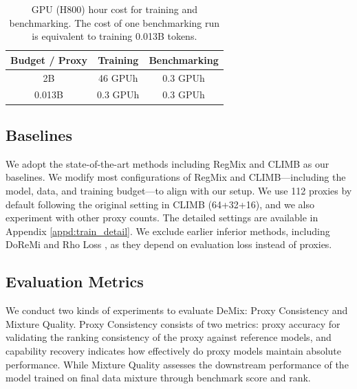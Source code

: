 \documentclass{article}
\theoremstyle{plain}
\theoremstyle{definition}
\theoremstyle{remark}
\newcommand{\comments}[1]{\textcolor{red}{#1}}
\begin{document}
\begin{table}[t]
  \caption{GPU (H800) hour cost for training and benchmarking. The cost of one benchmarking run is equivalent to training 0.013B tokens.}
  \label{table:cost}
  \begin{center}
        \begin{tabular}{ccc}
          \toprule
          Budget / Proxy & Training & Benchmarking\\
          \midrule
        2B & 46 GPUh & 0.3 GPUh \\
        0.013B & 0.3 GPUh & 0.3 GPUh \\
          \bottomrule
        \end{tabular}
  \end{center}
  \vskip -0.1in
\end{table}



\subsection{Baselines}
We adopt the state-of-the-art methods including RegMix \cite{liu2024regmix} and CLIMB \cite{diao2025climb} as our baselines. We modify most configurations of RegMix and CLIMB—including the model, data, and training budget—to align with our setup. We use 112 proxies by default following the original setting in CLIMB (64+32+16), and we also experiment with other proxy counts. The detailed settings are available in Appendix \ref{appd:train_detail}. We exclude earlier inferior methods, including DoReMi \cite{xie2023doremi} and Rho Loss \cite{mindermann2022prioritized}, as they depend on evaluation loss instead of proxies.%



\subsection{Evaluation Metrics}


We conduct two kinds of experiments to evaluate DeMix: Proxy Consistency and Mixture Quality. Proxy Consistency consists of two metrics: proxy accuracy for validating the ranking consistency of the proxy against reference models, and capability recovery indicates how effectively do proxy models maintain absolute performance. While Mixture Quality assesses the downstream performance of the model trained on final data mixture through benchmark score and rank.
\end{document}
